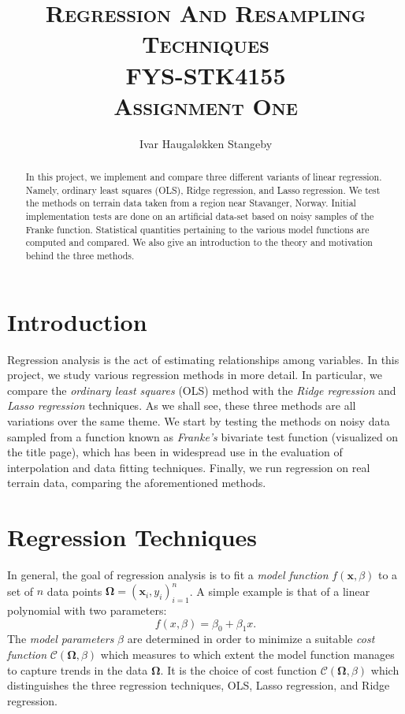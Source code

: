 \documentclass[dvipsnames, article, a4paper, oneside, 12pt]{memoir}
\title{\Large\textsc{Regression And Resampling Techniques \\
  FYS-STK4155 \\
Assignment One}}
\author{Ivar Haugal{\o}kken Stangeby}
\newcommand{\x}{\bm{x}}
\newcommand{\data}{\bm{\Omega}}
\newcommand{\cost}{\mathcal{C}}
\begin{document}
  \maketitle 
  \clearpage
 	
  \begin{abstract}
	  In this project, we implement and compare three different variants of
	  linear regression. Namely, ordinary least squares (OLS), Ridge
	  regression, and Lasso regression. We test the methods on terrain data
	  taken from a region near Stavanger, Norway. Initial implementation
	  tests are done on an artificial data-set based on noisy samples of
	  the Franke function. Statistical quantities pertaining to the various
	  model functions are computed and compared. We also give an
	  introduction to the theory and motivation behind the three methods.
  \end{abstract}

  \tableofcontents

  \chapter{Introduction}
   
  Regression analysis is the act of estimating relationships among variables.
  In this project, we study various regression methods in more detail. In
  particular, we compare the \emph{ordinary least squares} (OLS) method with
  the \emph{Ridge regression} and \emph{Lasso regression} techniques. As we
  shall see, these three methods are all variations over the same theme. We
  start by testing the methods on noisy data sampled from a function known as
  \emph{Franke's} bivariate test function (visualized on the title page), which
  has been in widespread use in the evaluation of interpolation and data
  fitting techniques. Finally, we run regression on real terrain data,
  comparing the aforementioned methods.

  \chapter{Regression Techniques}
  \label{chp:regression}

  In general, the goal of regression analysis is to fit a \emph{model function}
  \( f(\x, \beta) \) to a set of \( n \) data points \( \data = (\x_i,
  y_i)_{i=1}^n \). A simple example is that of a linear polynomial with two
  parameters:
  \begin{equation}
    f(x, \beta) = \beta_0 + \beta_1 x.
  \end{equation}
  The \emph{model parameters} \( \beta \) are determined in order to minimize a
  suitable \emph{cost function} \(\cost(\data, \beta)\) which measures to which
  extent the model function manages to capture trends in the data \( \data \).
  It is the choice of cost function \( \mathcal{C}(\data, \beta)\) which
  distinguishes  the three regression techniques, OLS, Lasso regression, and
  Ridge regression.
\end{document}
